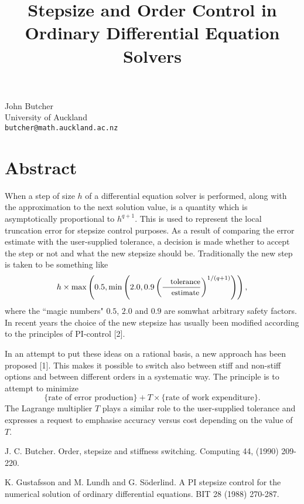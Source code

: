 \title{Stepsize and Order Control in Ordinary Differential Equation Solvers}
 \author{} \institute{}
\maketitle
\begin{center}
{\large John Butcher}\\
University of Auckland\\
{\tt butcher@math.auckland.ac.nz}

\end{center}

\section*{Abstract}

When a step of size $h$ of a differential equation solver is performed, along with the approximation
to the next solution value, is a quantity which is asymptotically proportional to $h^{q+1}$.
This is used to represent the local truncation error for stepsize control purposes.
As a result of comparing the error estimate with the user-supplied tolerance, a decision
is made whether to accept the step or not and what the new stepsize should be.
Traditionally the new step is taken to be something like
\[
h \times \max\left(0.5, \min\left(2.0, 0.9\left(\frac{\mbox{\small tolerance}}{\mbox{\small estimate}}\right)^{1/(q+1)}\right)\right),
\]
where the ``magic numbers" $0.5$, $2.0$ and $0.9$ are somwhat arbitrary safety factors.
In recent years the choice of the new stepsize has usually been modified according to the principles of PI-control [2].

In an attempt to put these ideas on a rational basis, a new approach has been proposed [1].  This makes it possible 
to switch also between stiff and non-stiff options and between different orders in a systematic way.
The principle is to attempt to minimize 
\[
\{\mbox{rate of error production}\} + T\times \{\mbox{rate of  work expenditure}\}.
\]
The Lagrange multiplier $T$ plays a similar role to the user-supplied tolerance and expresses a request to emphasise accuracy versus cost depending on the value of $T$.



\begin{thebibliography}{10}

{\sc J. C. Butcher}. {Order, stepsize and stiffness switching}. Computing 44, (1990) 209-220.



{\sc K. Gustafsson and M. Lundh and G. S\"oderlind}. {A PI stepsize control for the numerical solution of ordinary differential equations}. BIT 28 (1988) 270-287.

\end{thebibliography}
